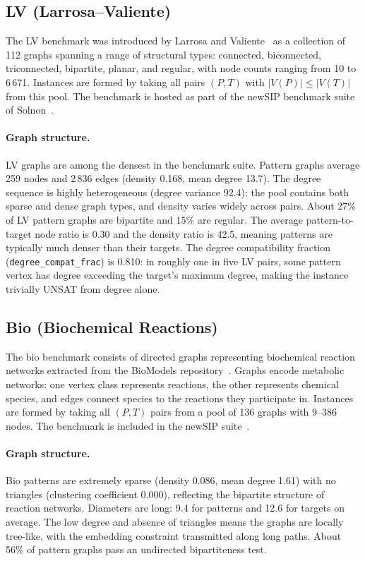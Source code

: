 \documentclass[11pt,a4paper]{article}
\begin{document}
\subsection{LV (Larrosa--Valiente)}
\label{sec:lv}

The LV benchmark was introduced by Larrosa and Valiente~\cite{larrosa-valiente-2002} as a
collection of 112 graphs spanning a range of structural types: connected, biconnected,
triconnected, bipartite, planar, and regular, with node counts ranging from 10 to 6\,671.
Instances are formed by taking all pairs $(P, T)$ with $|V(P)| \le |V(T)|$ from this pool.
The benchmark is hosted as part of the newSIP benchmark suite of Solnon~\cite{newsip-gbrpr2019}.

\paragraph{Graph structure.} LV graphs are among the densest in the benchmark suite.
Pattern graphs average 259 nodes and 2\,836 edges (density 0.168, mean degree 13.7).
The degree sequence is highly heterogeneous (degree variance 92.4): the pool contains both
sparse and dense graph types, and density varies widely across pairs.
About 27\% of LV pattern graphs are bipartite and 15\% are regular.
The average pattern-to-target node ratio is 0.30 and the density ratio is 42.5,
meaning patterns are typically much denser than their targets.
The degree compatibility fraction (\texttt{degree\_compat\_frac}) is 0.810: in roughly one
in five LV pairs, some pattern vertex has degree exceeding the target's maximum degree, making
the instance trivially UNSAT from degree alone.

\subsection{Bio (Biochemical Reactions)}
\label{sec:bio}

The bio benchmark consists of directed graphs representing biochemical reaction networks
extracted from the BioModels repository~\cite{bonnici-bioinformatics2013}.
Graphs encode metabolic networks: one vertex class represents reactions, the other represents
chemical species, and edges connect species to the reactions they participate in.
Instances are formed by taking all $(P, T)$ pairs from a pool of 136 graphs with 9--386 nodes.
The benchmark is included in the newSIP suite~\cite{newsip-gbrpr2019}.

\paragraph{Graph structure.} Bio patterns are extremely sparse (density 0.086, mean degree 1.61)
with no triangles (clustering coefficient 0.000), reflecting the bipartite structure of
reaction networks.
Diameters are long: 9.4 for patterns and 12.6 for targets on average.
The low degree and absence of triangles means the graphs are locally tree-like, with the embedding
constraint transmitted along long paths.
About 56\% of pattern graphs pass an undirected bipartiteness test.
\end{document}
